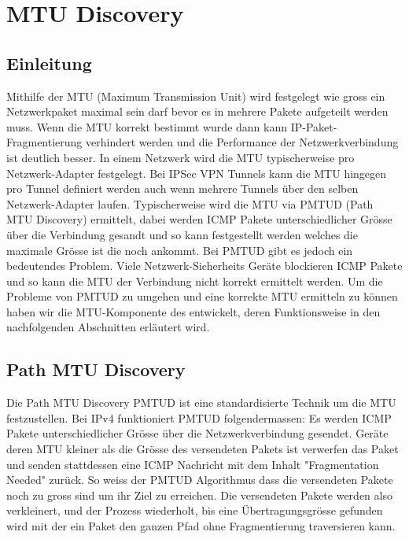 \section{MTU Discovery}
\label{sec:MTU Discovery}

\subsection{Einleitung}
Mithilfe der \acs{MTU} (Maximum Transmission Unit) wird festgelegt wie gross ein Netzwerkpaket maximal sein darf bevor es in mehrere Pakete aufgeteilt werden muss. Wenn die \acs{MTU} korrekt bestimmt wurde dann kann IP-Paket-Fragmentierung verhindert werden und die Performance der Netzwerkverbindung ist deutlich besser. In einem Netzwerk wird die \acs{MTU} typischerweise pro Netzwerk-Adapter festgelegt. Bei  \acs{IPSec} \acs{VPN} Tunnels kann die \acs{MTU} hingegen pro Tunnel definiert werden auch wenn mehrere Tunnels über den selben Netzwerk-Adapter laufen.
Typischerweise wird die MTU via \acs{PMTUD} (Path MTU Discovery) ermittelt, dabei werden \acs{ICMP} Pakete unterschiedlicher Grösse über die Verbindung gesandt und so kann festgestellt werden welches die maximale Grösse ist die noch ankommt.
Bei \acs{PMTUD} gibt es jedoch ein bedeutendes Problem. Viele Netzwerk-Sicherheits Geräte blockieren ICMP Pakete und so kann die \acs{MTU} der Verbindung nicht korrekt ermittelt werden.
Um die Probleme von \acs{PMTUD} zu umgehen und eine korrekte \acs{MTU} ermitteln zu können haben wir die MTU-Komponente des \tool entwickelt, deren Funktionsweise in den nachfolgenden Abschnitten erläutert wird.


\subsection{Path MTU Discovery}
Die Path MTU Discovery \acs{PMTUD} ist eine standardisierte Technik um die \acs{MTU} festzustellen.  Bei \acs{IPv4} funktioniert \acs{PMTUD} folgendermassen: Es werden \acs{ICMP} Pakete unterschiedlicher Grösse über die Netzwerkverbindung gesendet. Geräte deren \acs{MTU} kleiner als die Grösse des versendeten Pakets ist verwerfen das Paket und senden stattdessen eine \acs{ICMP} Nachricht mit dem Inhalt "Fragmentation Needed" zurück. So weiss der \acs{PMTUD} Algorithmus dass die versendeten Pakete noch zu gross sind um ihr Ziel zu erreichen. Die versendeten Pakete werden also verkleinert, und der Prozess wiederholt, bis eine Übertragungsgrösse gefunden wird mit der ein Paket den ganzen Pfad ohne Fragmentierung traversieren kann.

